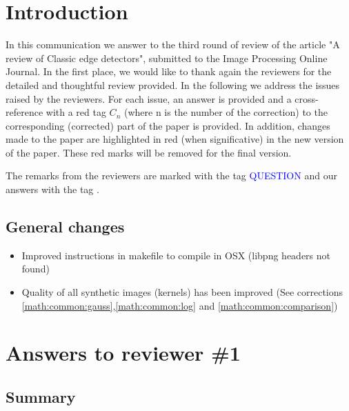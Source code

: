 \documentclass[a4paper,10pt]{report}
\title{}
\author{}
\begin{document}
\maketitle


\chapter{Introduction}
In this communication we answer to the third round of review of the article "A review of Classic edge detectors", submitted to the Image Processing Online Journal.
In the first place, we would like to thank again the reviewers for the detailed and thoughtful review provided. In the following we address the issues raised by the reviewers. For each issue, an answer is provided and a cross-reference with a red tag $C_n$ (where n is the number of the correction) to the corresponding (corrected) part of the paper is provided. In addition, changes made to the paper are highlighted in red (when significative) in the new version of the paper. 
These red marks will be removed for the final version.

The remarks from the reviewers are marked with the tag \textcolor{blue}{QUESTION} and our answers with the tag \ans.

\section{General changes}
\begin{itemize}
 \item Improved instructions in makefile to compile in OSX (libpng headers not found)
 \item Quality of all synthetic images (kernels) has been improved (See corrections \ref{math:common:gauss},\ref{math:common:log} and \ref{math:common:comparison})

\end{itemize}


\chapter{Answers to reviewer \#1}

\section{Summary}
\end{document}
